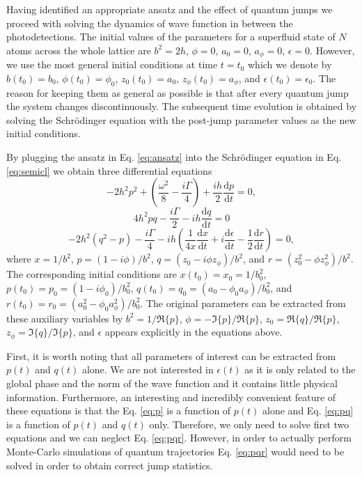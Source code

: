 Having identified an appropriate ansatz and the effect of quantum
jumps we proceed with solving the dynamics of wave function in between
the photodetections. The initial values of the parameters for a
superfluid state of $N$ atoms across the whole lattice are $b^2 = 2h$,
$\phi =0$, $a_0 = 0$, $a_\phi = 0$, $\epsilon = 0$. However, we use
the most general initial conditions at time $t = t_0$ which we denote
by $b(t_0) = b_0$, $\phi(t_0) = \phi_0$, $z_0(t_0) = a_0$,
$z_\phi(t_0) = a_\phi$, and $\epsilon(t_0) = \epsilon_0$. The reason
for keeping them as general as possible is that after every quantum
jump the system changes discontinuously. The subsequent time evolution
is obtained by solving the Schr\"{o}dinger equation with the post-jump
parameter values as the new initial conditions.

By plugging the ansatz in Eq. \eqref{eq:ansatz} into the
Schr\"{o}dinger equation in Eq. \eqref{eq:semicl} we obtain three
differential equations
\begin{equation}
  \label{eq:p}
  -2 h^2 p^2 + \left( \frac{ \omega^2 } { 8 } - \frac{ i \Gamma } { 4
    } \right) + \frac{ i h } { 2 } \frac{ \mathrm{d} p } { \mathrm{d}
    t } = 0,
\end{equation}
\begin{equation}
  \label{eq:pq}
  4 h^2 p q - \frac{ i \Gamma } { 2 } - i h \frac{ \mathrm{d} q } {
    \mathrm{d} t } = 0
\end{equation}
\begin{equation}
  \label{eq:pqr}
  -2 h^2 (q^2 - p) - \frac{ i \Gamma } { 4 } - i h \left( \frac{ 1 } {
      4 x } \frac{ \mathrm{d} x } {\mathrm{d} t } + i \frac{
      \mathrm{d} \epsilon } { \mathrm{d} t } - \frac{1}{2} \frac{
      \mathrm{d} r } { \mathrm{d} t } \right) = 0,
\end{equation}
where $x = 1/b^2$, $p = (1 - i \phi)/b^2$,
$q = (z_0 - i \phi z_\phi)/b^2$, and
$r = (z_0^2 - \phi z_\phi^2)/b^2$. The corresponding initial
conditions are $x(t_0) = x_0 = 1/b_0^2$,
$p(t_0) = p_0 = (1 - i \phi_0)/b_0^2$,
$q(t_0) = q_0 = (a_0 - \phi_0 a_\phi)/b_0^2$, and
$r(t_0) = r_0 = (a_0^2 - \phi_0 a_\phi^2)/b_0^2$. The original
parameters can be extracted from these auxiliary variables by
$b^2 = 1 / \Re \{ p \}$, $\phi = - \Im \{ p \} / \Re \{ p \}$,
$z_0 = \Re \{ q \} / \Re \{ p \}$,
$z_\phi = \Im \{ q \} / \Im \{ p \}$, and $\epsilon$ appears
explicitly in the equations above.

First, it is worth noting that all parameters of interest can be
extracted from $p(t)$ and $q(t)$ alone. We are not interested in
$\epsilon(t)$ as it is only related to the global phase and the norm
of the wave function and it contains little physical
information. Furthermore, an interesting and incredibly convenient
feature of these equations is that the Eq. \eqref{eq:p} is a function
of $p(t)$ alone and Eq. \eqref{eq:pq} is a function of $p(t)$ and
$q(t)$ only. Therefore, we only need to solve first two equations and
we can neglect Eq. \eqref{eq:pqr}. However, in order to actually
perform Monte-Carlo simulations of quantum trajectories
Eq. \eqref{eq:pqr} would need to be solved in order to obtain correct
jump statistics.

